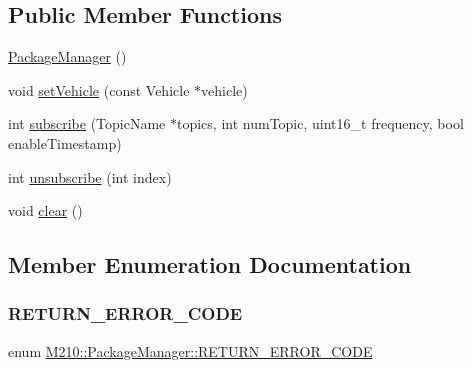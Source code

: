 \subsection*{Public Member Functions}
\begin{DoxyCompactItemize}
\item 
\mbox{\hyperlink{class_m210_1_1_package_manager_a269a5e51438236422dd3de365ea88860}{Package\+Manager}} ()
\item 
void \mbox{\hyperlink{class_m210_1_1_package_manager_a6c89556663cb2b7484f5819557dc2534}{set\+Vehicle}} (const Vehicle $\ast$vehicle)
\item 
int \mbox{\hyperlink{class_m210_1_1_package_manager_a0448702a3c39e0fc75da71fdf72ebd30}{subscribe}} (Topic\+Name $\ast$topics, int num\+Topic, uint16\+\_\+t frequency, bool enable\+Timestamp)
\item 
int \mbox{\hyperlink{class_m210_1_1_package_manager_a44c8f6bce0db6d2166048b53cef09f9f}{unsubscribe}} (int index)
\item 
void \mbox{\hyperlink{class_m210_1_1_package_manager_a01119dd3d0cc989f95bb7ed4bd94b043}{clear}} ()
\end{DoxyCompactItemize}


\subsection{Member Enumeration Documentation}
\mbox{\label{class_m210_1_1_package_manager_a2da6ff8ace580a0081e1412dd874e21d}} 
\subsubsection{\texorpdfstring{R\+E\+T\+U\+R\+N\+\_\+\+E\+R\+R\+O\+R\+\_\+\+C\+O\+DE}{RETURN\_ERROR\_CODE}}
{\footnotesize\ttfamily enum \mbox{\hyperlink{class_m210_1_1_package_manager_a2da6ff8ace580a0081e1412dd874e21d}{M210\+::\+Package\+Manager\+::\+R\+E\+T\+U\+R\+N\+\_\+\+E\+R\+R\+O\+R\+\_\+\+C\+O\+DE}}}

